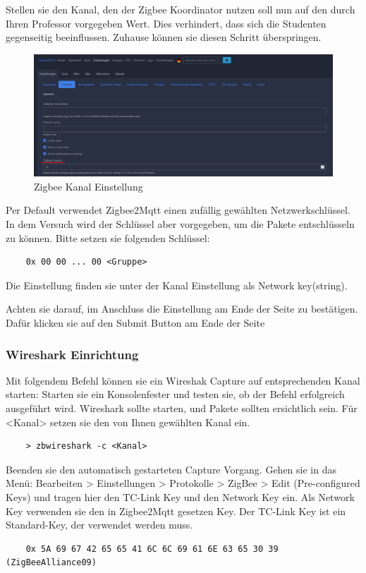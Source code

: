 Stellen sie den Kanal, den der Zigbee Koordinator nutzen soll nun auf den durch Ihren Professor vorgegeben Wert.
Dies verhindert, dass sich die Studenten gegenseitig beeinflussen. Zuhause können sie diesen Schritt überspringen.

\begin{figure}[H]
    \centering
    \includegraphics[width=1\textwidth]{media/Z2M-Channel.png}
    \caption{Zigbee Kanal Einstellung}
\end{figure}

Per Default verwendet Zigbee2Mqtt einen zufällig gewählten Netzwerkschlüssel. In dem Versuch wird der Schlüssel aber vorgegeben, um die Pakete
entschlüsseln zu können. Bitte setzen sie folgenden Schlüssel:

\begin{lstlisting}
    0x 00 00 ... 00 <Gruppe>
\end{lstlisting}

Die Einstellung finden sie unter der Kanal Einstellung als \grqq Network key(string)\grqq{}.

Achten sie darauf, im Anschluss die Einstellung am Ende der Seite zu bestätigen. Dafür klicken sie auf den 
\grqq Submit \grqq{} Button am Ende der Seite

\subsubsection{Wireshark Einrichtung}
Mit folgendem Befehl können sie ein Wireshak Capture auf entsprechenden Kanal starten:
Starten sie ein Konsolenfester und testen sie, ob der Befehl erfolgreich ausgeführt wird. Wireshark sollte starten, und Pakete sollten ersichtlich sein. Für \grqq 
<Kanal> \grqq{} setzen sie den von Ihnen gewählten Kanal ein.
\begin{lstlisting}
    > zbwireshark -c <Kanal>
\end{lstlisting}

Beenden sie den automatisch gestarteten Capture Vorgang. Gehen sie in das Menü: Bearbeiten > Einstellungen > Protokolle > ZigBee > Edit (Pre-configured Keys) und tragen
hier den \grqq TC-Link Key\grqq{} und den \grqq Network Key\grqq{} ein. Als \grqq Network Key\grqq{} verwenden sie den in Zigbee2Mqtt gesetzen Key. Der \grqq TC-Link Key\grqq{} ist ein
Standard-Key, der verwendet werden muss.
\begin{lstlisting}
    0x 5A 69 67 42 65 65 41 6C 6C 69 61 6E 63 65 30 39 (ZigBeeAlliance09)
\end{lstlisting}

